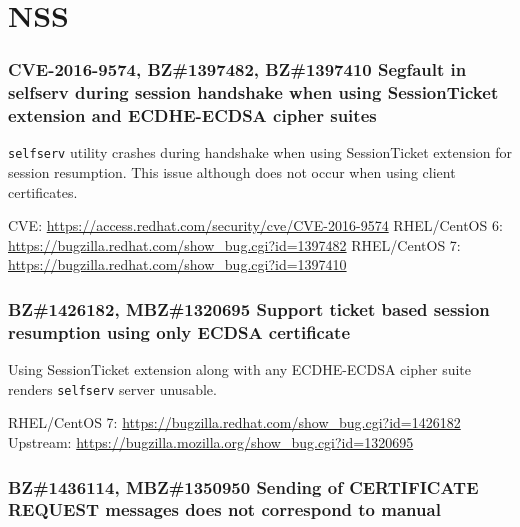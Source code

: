 \section{NSS}
\subsubsection*{{\color{red} CVE-2016-9574}, BZ\#1397482, BZ\#1397410  \newline
    Segfault in selfserv during session handshake when using SessionTicket
    extension and ECDHE-ECDSA cipher suites}

    \texttt{selfserv} utility crashes during handshake when using SessionTicket
    extension for session resumption. This issue although does not occur when
    using client certificates.

    \medskip\noindent CVE: \url{https://access.redhat.com/security/cve/CVE-2016-9574}
    \newline\noindent RHEL/CentOS 6: \url{https://bugzilla.redhat.com/show_bug.cgi?id=1397482}
    \newline\noindent RHEL/CentOS 7: \url{https://bugzilla.redhat.com/show_bug.cgi?id=1397410}

\subsubsection*{BZ\#1426182, MBZ\#1320695  \newline
    Support ticket based session resumption using only ECDSA certificate}

    Using SessionTicket extension along with any ECDHE-ECDSA cipher suite
    renders \texttt{selfserv} server unusable.

    \medskip\noindent RHEL/CentOS 7: \url{https://bugzilla.redhat.com/show_bug.cgi?id=1426182}
    \newline\noindent Upstream: \url{https://bugzilla.mozilla.org/show_bug.cgi?id=1320695}

\subsubsection*{BZ\#1436114, MBZ\#1350950  \newline
    Sending of CERTIFICATE REQUEST messages does not correspond to manual}

